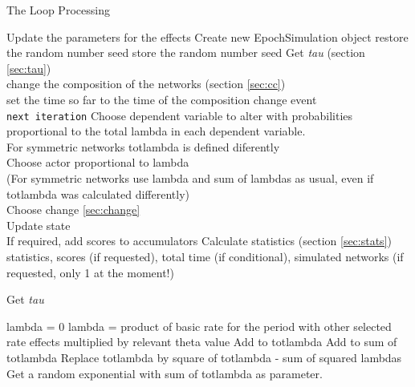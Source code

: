 \documentclass[12pt,a4paper]{article}
\makeatletter
\renewcommand{\=}{\,=\,}
\newcommand{\+}{\,+\,}
\newcommand{\nnm}[1]{\textsf{\small\textit{#1}}}
\renewcommand{\section}{\@startsection{section}{1}
                {0pt}{\baselineskip}{0.5\baselineskip}
                {\centering\sffamily} }
\renewcommand{\subsection}{\@startsection{subsection}{2}
                {0pt}{0.7\baselineskip}{0.3\baselineskip}
                {\sffamily} }
\makeatother
\begin{document}
\section{The Loop Processing}
\begin{algorithmic}
\STATE Update the parameters for the effects
\STATE Create new EpochSimulation object
\STATE restore the random number seed
\ELSE
\STATE store the random number seed
\ENDIF
\REPEAT
\STATE Get \nnm{tau} (section \ref{sec:tau})\\
\STATE change the composition of the networks (section \ref{sec:cc})\\
set the time so far to the time of the composition change event\\
\texttt{next iteration}
\ENDIF
\STATE Choose dependent variable to alter with probabilities
proportional to the total lambda in each dependent variable.\\
\STATE For symmetric networks totlambda is defined diferently\\
\STATE Choose actor proportional to lambda\\
(For symmetric networks use lambda and sum of lambdas as usual, even if
totlambda was calculated differently)\\
Choose change \ref{sec:change}\\
Update state\\
If required, add scores to accumulators
\STATE Calculate statistics (section \ref{sec:stats})
\ENDFOR
\ENDFOR
\RETURN statistics, scores (if requested), total time (if conditional),
simulated networks (if requested, only 1 at the moment!)
\end{algorithmic}
\subsection{Get \nnm{tau}}
\label{sec:tau}
\begin{algorithmic}
\STATE lambda = 0
\ELSE
\STATE lambda = product of basic rate for the period with other
selected rate effects multiplied by relevant theta value
\ENDIF
\STATE Add to totlambda
\ENDFOR
\STATE Add to sum of totlambda
\ENDFOR
{}
\STATE Replace totlambda by square of totlambda - sum of squared lambdas
\ENDIF
\STATE Get a random exponential with sum of totlambda as parameter.\\
\end{algorithmic}
\end{document}
